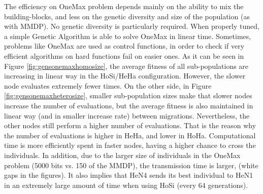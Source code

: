 \documentclass[final,1p,times]{elsarticle}
\begin{document}
The efficiency on OneMax problem depends mainly on the ability to mix
the building-blocks, and less on the genetic diversity and size of the
population (as with MMDP). No genetic diversity is particularly
required. When properly tuned, a simple Genetic Algorithm is able to
solve OneMax in linear time. Sometimes, problems like OneMax are used
as control functions, in order to check if very efficient algorithms
on hard functions fail on easier ones. As it can be seen in Figure
\ref{fig:gensonemaxhomosize}, the average fitness of all sub-populations
are increasing in linear way in the HoSi/HeHa configuration. However,
the slower node evaluates extremely fewer times.  On the other
side, in Figure \ref{fig:gensonemaxheterosize}, smaller sub-population
sizes make that slower nodes increase the number of evaluations,
but the average fitness is also maintained in linear way (and in
smaller increase rate) between migrations. Nevertheless, the other
nodes still perform a higher number of evaluations. That is the
reason why the number of evaluations is higher in HeHa, and lower in
HoHa. Computational time is more efficiently spent in faster nodes,
having a higher chance to cross the individuals. In addition, due to
the larger size of  individuals in the OneMax problem (5000 bits
vs. 150 of the MMDP), the transmission time is larger, (white gaps in the
figures). It also implies that HeN4 sends its best individual to
HeN1 in an extremely large amount of time when using HoSi (every 64
generations). 

\begin{table}
\centering
\caption{Results for the OneMax problem.}
\label{tab:onemaxresults}
\end{table}
\end{document}

